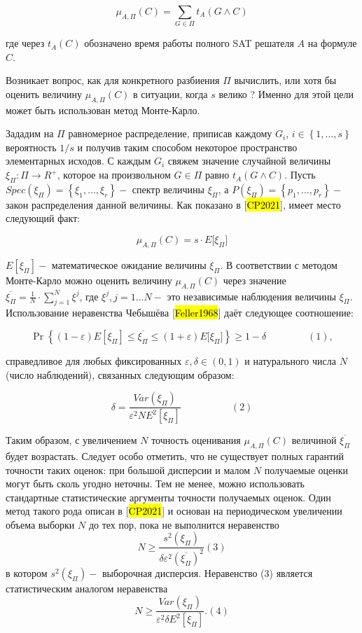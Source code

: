 \[\mu_{A,\Pi}(C) = \sum_{G \in \Pi}^{}{t_{A}(G \land C)}\]

где через $t_{A}(C)$ обозначено время работы полного SAT решателя $A$ на формуле $C$.

Возникает вопрос, как для конкретного разбиения $\Pi$ вычислить, или хотя бы оценить величину $\mu_{A,\Pi}(C)$ в ситуации, когда $s$ велико ? Именно для этой цели может быть использован метод Монте-Карло.

Зададим на $\Pi$ равномерное распределение, приписав каждому $G_{i}$, $i \in \left\{ 1,\ldots,s \right\}$ вероятность $1/s$ и получив таким способом некоторое пространство элементарных исходов. С каждым $G_{i}$ свяжем значение случайной величины $\xi_{\Pi}:\Pi \to R^{+}$, которое на произвольном $G \in \Pi$ равно $t_{A}(G \land C)$. Пусть $Spec\left( \xi_{\Pi} \right) = \left\{ \xi_{1},\ldots,\xi_{r} \right\} -$ спектр величины $\xi_{\Pi}$, а $P\left( \xi_{\Pi} \right) = \left\{ p_{1},\ldots,p_{r} \right\} -$ закон распределения данной величины. Как показано в {[}\hl{CP2021}{]}, имеет место следующий факт:

\[\mu_{A,\Pi}(C) = s \cdot E\lbrack\xi_{\Pi}\rbrack\]

$E\left\lbrack \xi_{\Pi} \right\rbrack -$ математическое ожидание величины $\xi_{\Pi}$. В соответствии с методом Монте-Карло можно оценить величину $\mu_{A,\Pi}(C)$ через значение $\overline{\xi_{\Pi}} = \frac{1}{N} \cdot \sum_{j = 1}^{N}\xi^{j}$, где $\xi^{j},j = 1\ldots N -$ это независимые наблюдения величины $\xi_{\Pi}$. Использование неравенства Чебышёва {[}\hl{Feller1968}{]} даёт следующее соотношение:

\[\Pr\left\{ (1 - \varepsilon)E\left\lbrack \xi_{\Pi} \right\rbrack \leq \overline{\xi_{\Pi}} \leq (1 + \varepsilon)E\lbrack\xi_{\Pi}\rbrack \right\} \geq 1 - \delta\ \ \ \ \ \ \ \ \ \ \ \ \ \ \ \ \ \ \ (1),\]

справедливое для любых фиксированных $\varepsilon,\delta \in (0,1)$ и натурального числа $N$ (число наблюдений), связанных следующим образом:

\[\delta = \frac{Var(\xi_{\Pi})}{\varepsilon^{2}NE^{2}\left\lbrack \xi_{\Pi} \right\rbrack}\ \ \ \ \ \ \ \ \ \ \ \ \ \ \ \ \ \ \ \ \ \ \ (2)\]

Таким образом, с увеличением $N$ точность оценивания $\mu_{A,\Pi}(C)$ величиной $\overline{\xi_{\Pi}}$ будет возрастать. Следует особо отметить, что не существует полных гарантий точности таких оценок: при большой дисперсии и малом $N$ получаемые оценки могут быть сколь угодно неточны. Тем не менее, можно использовать стандартные статистические аргументы точности получаемых оценок. Один метод такого рода описан в {[}\hl{CP2021}{]} и основан на периодическом увеличении объема выборки $N$ до тех пор, пока не выполнится неравенство
\[
    N \geq \frac{s^{2}\left( \xi_{\Pi} \right)}{\delta\varepsilon^{2}\left( \overline{\xi_{\Pi}} \right)^{2}} (3)
\]
в котором $s^{2}\left( \xi_{\Pi} \right) -$ выборочная дисперсия. Неравенство (3) является статистическим аналогом неравенства
\[
    N \geq \frac{Var\left( \xi_{\Pi} \right)}{\varepsilon^{2}\delta E^{2}\left\lbrack \xi_{\Pi} \right\rbrack}.  (4)
\]

